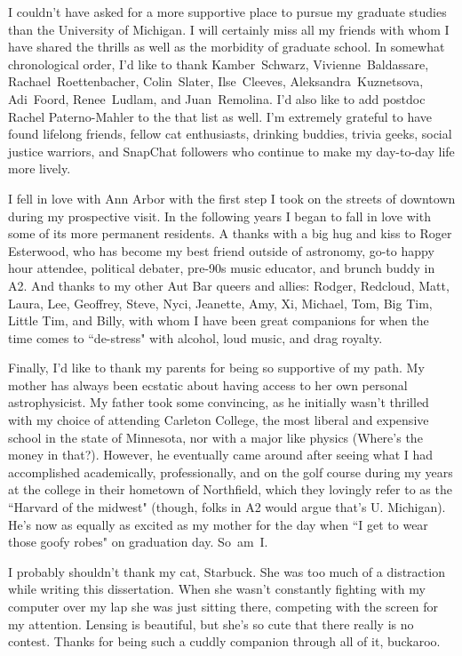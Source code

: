 I couldn't have asked for a more supportive place to pursue my graduate studies than the University of Michigan. I will certainly miss all my friends with whom I have shared the thrills as well as the morbidity of graduate school. In somewhat chronological order, I'd like to thank Kamber~Schwarz, Vivienne~Baldassare, Rachael~Roettenbacher, Colin~Slater, Ilse~Cleeves, Aleksandra~Kuznetsova, Adi~Foord, Renee~Ludlam, and Juan~Remolina. I'd also like to add postdoc Rachel Paterno-Mahler to the that list as well. I'm extremely grateful to have found lifelong friends, fellow cat enthusiasts, drinking buddies, trivia geeks, social justice warriors, and SnapChat followers who continue to make my day-to-day life more lively.

I fell in love with Ann Arbor with the first step I took on the streets of downtown during my prospective visit. In the following years I began to fall in love with some of its more permanent residents. A thanks with a big hug and kiss to Roger Esterwood, who has become my best friend outside of astronomy, go-to happy hour attendee, political debater, pre-90s music educator, and brunch buddy in A2. And thanks to my other Aut Bar queers and allies: Rodger, Redcloud, Matt, Laura, Lee, Geoffrey, Steve, Nyci, Jeanette, Amy, Xi, Michael, Tom, Big Tim, Little Tim, and Billy, with whom I have been great companions for when the time comes to ``de-stress" with alcohol, loud music, and drag royalty.

Finally, I'd like to thank my parents for being so supportive of my path. My mother has always been ecstatic about having access to her own personal astrophysicist. My father took some convincing, as he initially wasn't thrilled with my choice of attending Carleton College, the most liberal and expensive school in the state of Minnesota, nor with a major like physics (Where's the money in that?). However, he eventually came around after seeing what I had accomplished academically, professionally, and on the golf course during my years at the college in their hometown of Northfield, which they lovingly refer to as the ``Harvard of the midwest" (though, folks in A2 would argue that's U. Michigan). He's now as equally as excited as my mother for the day when ``I get to wear those goofy robes" on graduation day. So~am~I.

I probably shouldn't thank my cat, Starbuck. She was too much of a distraction while writing this dissertation. When she wasn't constantly fighting with my computer over my lap she was just sitting there, competing with the screen for my attention. Lensing is beautiful, but she's so cute that there really is no contest. Thanks for being such a cuddly companion through all of it, buckaroo.
